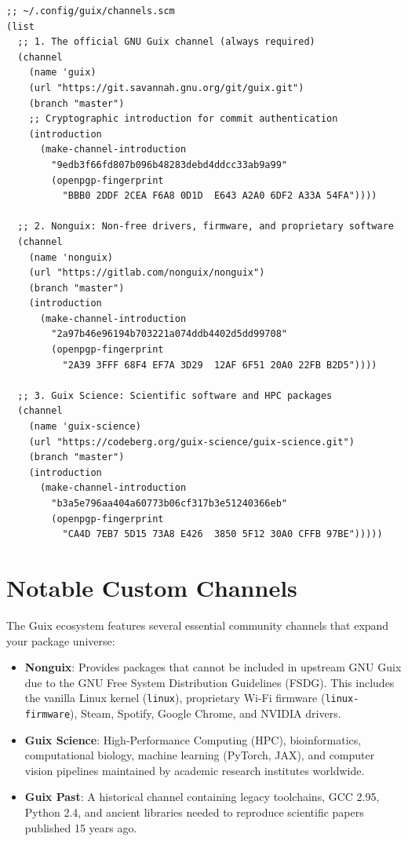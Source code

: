 \begin{lstlisting}[style=guixscheme]
;; ~/.config/guix/channels.scm
(list
  ;; 1. The official GNU Guix channel (always required)
  (channel
    (name 'guix)
    (url "https://git.savannah.gnu.org/git/guix.git")
    (branch "master")
    ;; Cryptographic introduction for commit authentication
    (introduction
      (make-channel-introduction
        "9edb3f66fd807b096b48283debd4ddcc33ab9a99"
        (openpgp-fingerprint
          "BBB0 2DDF 2CEA F6A8 0D1D  E643 A2A0 6DF2 A33A 54FA"))))

  ;; 2. Nonguix: Non-free drivers, firmware, and proprietary software
  (channel
    (name 'nonguix)
    (url "https://gitlab.com/nonguix/nonguix")
    (branch "master")
    (introduction
      (make-channel-introduction
        "2a97b46e96194b703221a074ddb4402d5dd99708"
        (openpgp-fingerprint
          "2A39 3FFF 68F4 EF7A 3D29  12AF 6F51 20A0 22FB B2D5"))))

  ;; 3. Guix Science: Scientific software and HPC packages
  (channel
    (name 'guix-science)
    (url "https://codeberg.org/guix-science/guix-science.git")
    (branch "master")
    (introduction
      (make-channel-introduction
        "b3a5e796aa404a60773b06cf317b3e51240366eb"
        (openpgp-fingerprint
          "CA4D 7EB7 5D15 73A8 E426  3850 5F12 30A0 CFFB 97BE")))))
\end{lstlisting}

\section{Notable Custom Channels}

The Guix ecosystem features several essential community channels that expand your package universe:

\begin{itemize}
  \item \textbf{Nonguix}: Provides packages that cannot be included in upstream GNU Guix due to the GNU Free System Distribution Guidelines (FSDG). This includes the vanilla Linux kernel (\texttt{linux}), proprietary Wi-Fi firmware (\texttt{linux-firmware}), Steam, Spotify, Google Chrome, and NVIDIA drivers.
  \item \textbf{Guix Science}: High-Performance Computing (HPC), bioinformatics, computational biology, machine learning (PyTorch, JAX), and computer vision pipelines maintained by academic research institutes worldwide.
  \item \textbf{Guix Past}: A historical channel containing legacy toolchains, GCC 2.95, Python 2.4, and ancient libraries needed to reproduce scientific papers published 15 years ago.
\end{itemize}

